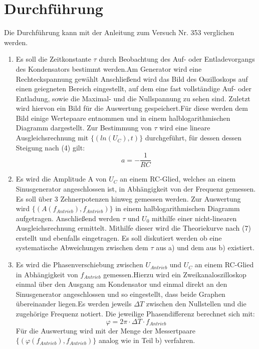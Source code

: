 \section{Durchführung}
\label{sec:Durchführung}
Die Durchführung kann mit der Anleitung zum Versuch Nr. 353 \cite{V353} verglichen werden.
\renewcommand{\labelenumi}{\alph{enumi})}
\begin{enumerate}
  \item Es soll die Zeitkonstante $\tau$ durch Beobachtung des Auf- oder Entladevorgangs
  des Kondensators bestimmt werden.Am Generator wird eine Rechteckspannung gewählt
  Anschließend wird das Bild des Oszilloskops auf einen
  geiegneten Bereich eingestellt, auf dem eine fast vollständige Auf- oder Entladung, sowie
  die Maximal- und die Nullspannung zu sehen sind. Zuletzt wird hiervon ein Bild für die
  Auswertung gespeichert.Für diese werden dem Bild einige Wertepaare entnommen und in einem
  halblogarithmischen Diagramm dargestellt. Zur Bestimmung von $\tau$ wird eine
  lineare Ausgleichsrechnung mit $\{(ln(U_C), t)\}$ durchgeführt, für dessen dessen Steigung nach (4) gilt:
  \begin{equation}
  a = -\frac{1}{RC}
  \end{equation}

  \item Es wird die Amplitude A von $U_C$ an einem RC-Glied, welches an einem Sinusgenerator
   angeschlossen ist, in Abhängigkeit von der Frequenz gemessen. Es soll über
   3 Zehnerpotenzen hinweg gemessen werden. Zur Auswertung wird $\{(A(f_{Antrieb}), f_{Antrieb})\}$
   in einem halblogarithmischen Diagramm aufgetragen. Anschließend werden $\tau$ und $U_0$ mithilfe einer nicht-linearen
    Ausgleichsrechnung ermittelt. Mithilfe dieser wird die Theoriekurve nach (7) erstellt und
    ebenfalls eingetragen. Es soll diskutiert werden ob eine systematische Abweichungen
    zwischen dem $\tau$ aus a) und dem aus b) existiert.



    \item Es wird die Phasenverschiebung zwischen $U_{Antrieb}$ und $U_C$ an einem
    RC-Glied in Abhängigkeit von $f_{Antrieb}$ gemessen.Hierzu wird ein Zweikanaloszilloskop
    einmal über den Ausgang am Kondensator und einmal direkt an den Sinusgenerator angeschlossen
     und so eingestellt, dass beide Graphen übereinander liegen.Es werden jeweils
      $\Delta T$ zwischen den Nullstellen und die zugehörige Frequenz notiert. Die jeweilige
       Phasendifferenz berechnet sich mit:
       \begin{equation}
         \varphi = 2 \pi \cdot \Delta T \cdot f_{Antrieb}
       \end{equation}
       Für die Auswertung wird mit der Menge der Messertpaare $\{(\varphi(f_{Antrieb}),f_{Antrieb})\}$
       analog wie in Teil b) verfahren.


\end{enumerate}
